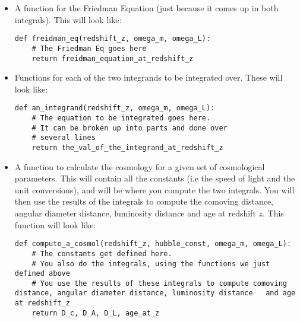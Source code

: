 \documentclass[]{article}
\begin{document}
\begin{itemize}
\item A function for the Friedman Equation (just because it comes up in both integrals). This will look like:
\begin{lstlisting}
def freidman_eq(redshift_z, omega_m, omega_L):
    # The Friedman Eq goes here 
    return freidman_equation_at_redshift_z
\end{lstlisting}

\item Functions for each of the two integrands to be integrated over. These will look like:
\begin{lstlisting}
def an_integrand(redshift_z, omega_m, omega_L):
    # The equation to be integrated goes here.
    # It can be broken up into parts and done over 
    # several lines
    return the_val_of_the_integrand_at_redshift_z
\end{lstlisting}

\item A function to calculate the cosmology for a given set of cosmological parameters. This will contain all the constants (i.e the speed of light and the unit conversions), and will be where you compute the two integrals. You will then use the results of the integrals to compute the comoving distance, angular diameter distance, luminosity distance and age at redshift $z$. This function will look like:
\begin{lstlisting}
def compute_a_cosmol(redshift_z, hubble_const, omega_m, omega_L):
    # The constants get defined here.
    # You also do the integrals, using the functions we just defined above
    # You use the results of these integrals to compute comoving distance, angular diameter distance, luminosity distance 	and age at redshift_z
    return D_c, D_A, D_L, age_at_z
\end{lstlisting}


\end{itemize}
\end{document}
